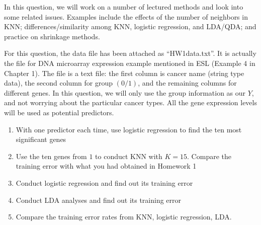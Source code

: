 \documentclass[14pt]{elegantbook}
\begin{document}
\begin{exercise*}
  In this question, we will work on a number of lectured methods and look into some related issues. Examples include the effects of the number of neighbors in KNN; differences/similarity among KNN, logistic regression, and LDA/QDA; and practice on shrinkage methods. 

  For this question, the data file has been attached as “HW1data.txt”. It is actually the file for DNA microarray expression example mentioned in ESL (Example 4 in Chapter 1). The file is a text file: the first column is cancer name (string type data), the second column for group $(0/1)$, and the remaining columns for different genes. In this question, we will only use the group information as our $Y$, and not worrying about the particular cancer types. All the gene expression levels will be used as potential predictors. 
  \begin{enumerate}
    \item With one predictor each time, use logistic regression to find the ten most significant genes
    \item Use the ten genes from $1$ to conduct KNN with $K=15$. Compare the training error with what you had obtained in Homework 1
    \item Conduct logistic regression and find out its training error
    \item Conduct LDA analyses and find out its training error
    \item Compare the training error rates from KNN, logistic regression, LDA. 
  \end{enumerate}
\end{exercise*}
\end{document}
